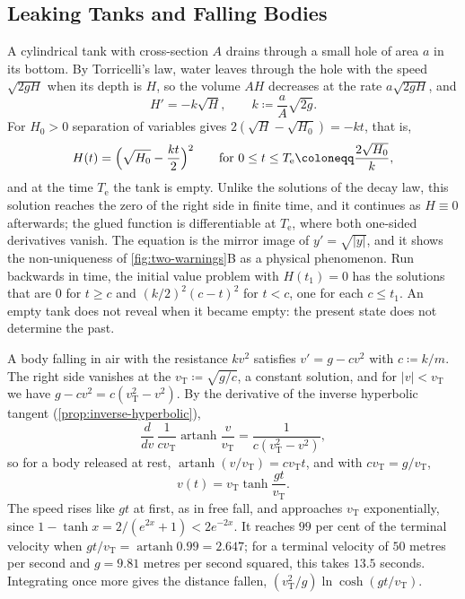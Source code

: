 \subsection{Leaking Tanks and Falling Bodies}

A cylindrical tank with cross-section $A$ drains through a small hole of area $a$ in its bottom. By Torricelli's law, water leaves through the hole with the speed $\sqrt{2gH}$ when its depth is $H$, so the volume $AH$ decreases at the rate $a\sqrt{2gH}$, and
\[
H'=-k\sqrt H,\qquad k\coloneqq\frac aA\sqrt{2g} .
\]
For $H_0>0$ separation of variables gives $2(\sqrt H-\sqrt{H_0})=-kt$, that is,
\[
H(t)=\Bigl(\sqrt{H_0}-\frac{kt}2\Bigr)^2\qquad\text{for }0\le t\le T_{\mathrm e}\coloneqq\frac{2\sqrt{H_0}}k ,
\]
and at the time $T_{\mathrm e}$ the tank is empty. Unlike the solutions of the decay law, this solution reaches the zero of the right side in finite time, and it continues as $H\equiv0$ afterwards; the glued function is differentiable at $T_{\mathrm e}$, where both one-sided derivatives vanish. The equation is the mirror image of $y'=\sqrt{|y|}$, and it shows the non-uniqueness of \cref{fig:two-warnings}B as a physical phenomenon. Run backwards in time, the initial value problem with $H(t_1)=0$ has the solutions that are $0$ for $t\ge c$ and $(k/2)^2(c-t)^2$ for $t<c$, one for each $c\le t_1$. An empty tank does not reveal when it became empty: the present state does not determine the past.

A body falling in air with the resistance $kv^2$ satisfies $v'=g-cv^2$ with $c\coloneqq k/m$. The right side vanishes at the  $v_{\mathrm T}\coloneqq\sqrt{g/c}$, a constant solution, and for $|v|<v_{\mathrm T}$ we have $g-cv^2=c(v_{\mathrm T}^2-v^2)$. By the derivative of the inverse hyperbolic tangent (\cref{prop:inverse-hyperbolic}),
\[
\frac d{dv}\,\frac1{cv_{\mathrm T}}\operatorname{artanh}\frac v{v_{\mathrm T}}=\frac1{c(v_{\mathrm T}^2-v^2)} ,
\]
so for a body released at rest, $\operatorname{artanh}(v/v_{\mathrm T})=cv_{\mathrm T}t$, and with $cv_{\mathrm T}=g/v_{\mathrm T}$,
\[
v(t)=v_{\mathrm T}\tanh\frac{gt}{v_{\mathrm T}} .
\]
The speed rises like $gt$ at first, as in free fall, and approaches $v_{\mathrm T}$ exponentially, since $1-\tanh x=2/(e^{2x}+1)<2e^{-2x}$. It reaches $99$ per cent of the terminal velocity when $gt/v_{\mathrm T}=\operatorname{artanh}0.99=2.647$; for a terminal velocity of $50$ metres per second and $g=9.81$ metres per second squared, this takes $13.5$ seconds. Integrating once more gives the distance fallen, $(v_{\mathrm T}^2/g)\ln\cosh(gt/v_{\mathrm T})$.

